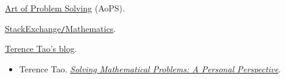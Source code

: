\documentclass[oneside]{book}
\numberwithin{equation}{section}
\begin{document}
\begin{thebibliography}{99}
	 \href{https://artofproblemsolving.com/}{Art of Problem Solving} (AoPS).
	
	 \href{https://math.stackexchange.com/}{StackExchange\texttt{/}Mathematics}.
	
	 \href{https://terrytao.wordpress.com}{Terence Tao's blog}.
	\begin{itemize}
		\item Terence Tao. \href{https://terrytao.wordpress.com/books/solving-mathematical-problems-a-personal-perspective/}{\textit{Solving Mathematical Problems: A Personal Perspective}}.
	\end{itemize}
\end{thebibliography}

\printbibliography[heading=bibintoc]
\end{document}
